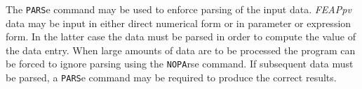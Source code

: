 \headb

The {\tt PARS}e command may be used to enforce parsing
of the input data.  {\sl FEAPpv} data may be input in either direct
numerical form or in parameter or expression form.  In the
latter case the data must be parsed in order to compute the
value of the data entry.  When large amounts of data are to
be processed the program can be forced to ignore parsing
using the {\tt NOPA}rse command.  If subsequent data must be
parsed, a {\tt PARS}e command may be required to produce the
correct results.
\vfil\eject

